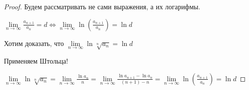 \begin{proof}\slashns
	
	Будем рассматривать не сами выражения, а их логарифмы.

	$\lim\limits_{n \to \infty} \frac{a_{n+1}}{a_n} = d \iff \lim\limits_{n \to \infty} \ln(\frac{a_{n+1}}{a_n}) = \ln d$

	Хотим доказать, что $\lim\limits_{n \to \infty} \ln \sqrt[n]{a_n} = \ln d$
	

	Применяем Штольца!
	
	$\lim\limits_{n \to \infty} \ln \sqrt[n]{a_n} = \lim\limits_{n \to \infty} \frac{\ln a_n}{n} = \lim\limits_{n \to \infty} \frac{\ln a_{n+1} - \ln a_n}{(n+1) - n} = \lim\limits_{n \to \infty} \ln (\frac{a_{n+1}}{a_n}) = \ln d$
	
\end{proof}

